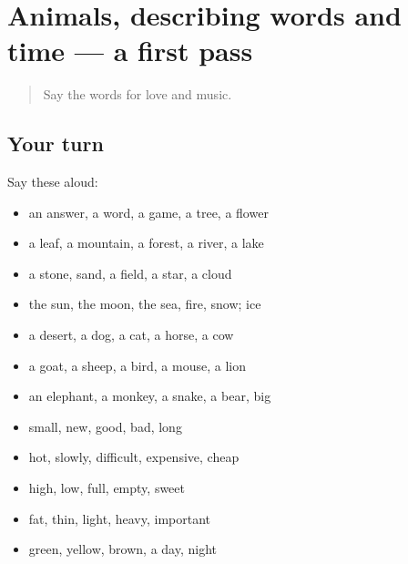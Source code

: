 \section[(dialogue)]{Animals, describing words and time — a first pass}

\label{lesson:UR-R87-first-pass-animals-describing-words-and-time}



\begin{quote}
Say the words for love and music.
\end{quote}

\subsection*{Your turn}
Say these aloud:

\begin{itemize}
\raggedright
  \item an answer, a word, a game, a tree, a flower
  \item a leaf, a mountain, a forest, a river, a lake
  \item a stone, sand, a field, a star, a cloud
  \item the sun, the moon, the sea, fire, snow; ice
  \item a desert, a dog, a cat, a horse, a cow
  \item a goat, a sheep, a bird, a mouse, a lion
  \item an elephant, a monkey, a snake, a bear, big
  \item small, new, good, bad, long
  \item hot, slowly, difficult, expensive, cheap
  \item high, low, full, empty, sweet
  \item fat, thin, light, heavy, important
  \item green, yellow, brown, a day, night
\end{itemize}

